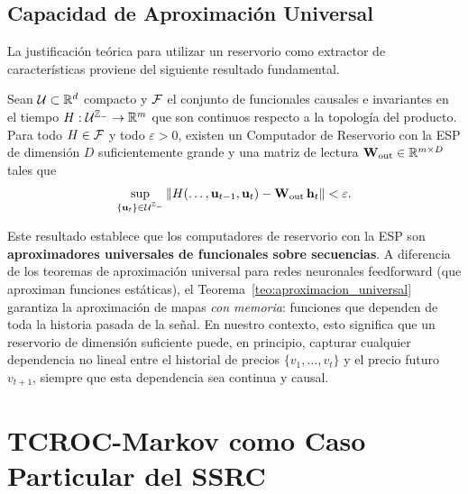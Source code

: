 \subsection{Capacidad de Aproximación Universal}
\label{subsec:aproximacion_universal}

La justificación teórica para utilizar un reservorio como extractor
de características proviene del siguiente resultado fundamental.

\begin{theorem}
\label{teo:aproximacion_universal}
Sean $\mathcal{U} \subset \mathbb{R}^d$ compacto y $\mathcal{F}$ el
conjunto de funcionales causales e invariantes en el tiempo
$H: \mathcal{U}^{\mathbb{Z}_{-}} \to \mathbb{R}^m$ que son continuos
respecto a la topología del producto.  Para todo $H \in \mathcal{F}$ y
todo $\varepsilon > 0$, existen un Computador de Reservorio con
la ESP de dimensión $D$ suficientemente grande y una matriz de
lectura $\mathbf{W}_{\text{out}} \in \mathbb{R}^{m \times D}$ tales
que
\begin{equation}
    \sup_{\{\mathbf{u}_t\} \in \mathcal{U}^{\mathbb{Z}_{-}}}
    \|H(\ldots, \mathbf{u}_{t-1}, \mathbf{u}_t) -
    \mathbf{W}_{\text{out}}\,\mathbf{h}_t\| < \varepsilon.
    \label{eq:aproximacion_universal}
\end{equation}
\end{theorem}

Este resultado establece que los computadores de reservorio con la
ESP son \textbf{aproximadores universales de funcionales sobre
secuencias}.  A diferencia de los teoremas de aproximación universal
para redes neuronales feedforward (que aproximan funciones estáticas),
el Teorema~\ref{teo:aproximacion_universal} garantiza la aproximación
de mapas \emph{con memoria}: funciones que dependen de toda la
historia pasada de la señal.  En nuestro contexto, esto significa que
un reservorio de dimensión suficiente puede, en principio, capturar
cualquier dependencia no lineal entre el historial de precios
$\{v_1, \ldots, v_t\}$ y el precio futuro $v_{t+1}$, siempre que
esta dependencia sea continua y causal.

\section{TCROC-Markov como Caso Particular del SSRC}
\label{sec:tcroc_como_caso_particular}

